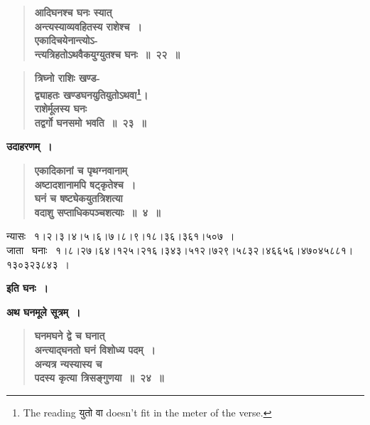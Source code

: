 \documentclass[11pt, openany]{book}
\begin{document}
\newpage

 \label{1.22}
\begin{quote}
{\large \textbf{{\color{purple}आदिघनश्च घनः स्यात् \\
अन्त्यस्याव्यवहितस्य राशेश्च~।\\
एकादिचयेनान्त्योऽ-\\
न्त्यत्रिहतोऽथवैकयुग्युतश्च घनः~॥~२२~॥}}}
\end{quote}
\vspace{-8mm}

 \label{1.23}
\begin{quote}
{\large \textbf{{\color{purple}त्रिघ्नो राशिः खण्ड-\\
द्व्याहतः खण्डघनयुतियुतोऽथवा\renewcommand{\thefootnote}{१}\footnote{The reading युतो वा doesn’t fit in the meter of the verse.}।\\ 
राशेर्मूलस्य घनः \\
तद्वर्गो घनसमो भवति~॥~२३~॥}}}
\end{quote}

\noindent \textbf{उदाहरणम्~।}

 \label{Ex 1.4}
\begin{quote}
\textbf{{\color{red}एकादिकानां च पृथग्नवानाम् \\
अष्टादशानामपि षट्कृतेश्च~।\\
घनं च षष्ट्येकयुतत्रिशत्या \\
वदाशु सप्ताधिकपञ्चशत्याः~॥~४~॥}}
\end{quote}

न्यासः ~१।२।३।४।५।६।७।८।९।१८।३६।३६१।५०७~। \\

जाता ~घनाः ~१।८।२७।६४।१२५।२१६।३४३।५१२।७२९।५८३२।४६६५६।४७०४५८८१।\\
१३०३२३८४३~।

\begin{center}
\textbf{इति घनः~।}\\
\vspace{8mm}

\textbf{अथ घनमूले सूत्रम्~।}
\end{center}
\vspace{-3mm}

 \label{1.24}
\begin{quote}
{\large \textbf{{\color{purple}घनमघने द्वे च घनात् \\
अन्त्याद्घनतो घनं विशोध्य पदम्~।\\
अन्यत्र न्यस्यास्य च \\
पदस्य कृत्या त्रिसङ्गुणया~॥~२४~॥}}}
\end{quote}
\end{document}
